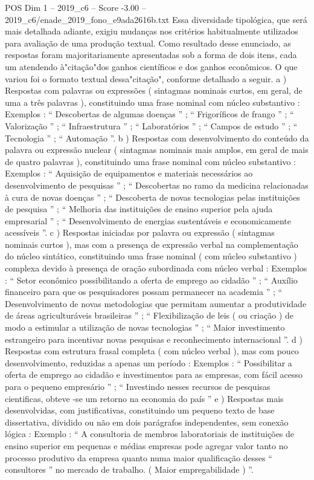 \begin{textsample}{POS Dim 1 – 2019\_c6 – Score -3.00 – 2019\_c6/enade\_2019\_fono\_e9ada2616b.txt}
Essa diversidade tipológica, que será mais detalhada adiante, exigiu mudanças nos critérios habitualmente utilizados para avaliação de uma produção textual.
Como resultado desse enunciado, as respostas foram majoritariamente apresentadas sob a forma de dois itens, cada um atendendo à"citação"dos ganhos científicos e dos ganhos econômicos.
O que variou foi o formato textual dessa"citação", conforme detalhado a seguir. a ) Respostas com palavras ou expressões ( sintagmas nominais curtos, em geral, de uma a três palavras ), constituindo uma frase nominal com núcleo substantivo : Exemplos : “ Descobertas de algumas doenças ” ; “ Frigoríficos de frango ” ; “ Valorização ” ; “ Infraestrutura ” ; “ Laboratórios ” ; “ Campos de estudo ” ; “ Tecnologia ” ; “ Automação ”. b ) Respostas com desenvolvimento do conteúdo da palavra ou expressão nuclear ( sintagmas nominais mais amplos, em geral de mais de quatro palavras ), constituindo uma frase nominal com núcleo substantivo : Exemplos : “ Aquisição de equipamentos e materiais necessários ao desenvolvimento de pesquisas ” ; “ Descobertas no ramo da medicina relacionadas à cura de novas doenças ” ; “ Descoberta de novas tecnologias pelas instituições de pesquisa ” ; “ Melhoria das instituições de ensino superior pela ajuda empresarial ” ; “ Desenvolvimento de energias sustentáveis e economicamente acessíveis ”. c ) Respostas iniciadas por palavra ou expressão ( sintagmas nominais curtos ), mas com a presença de expressão verbal na complementação do núcleo sintático, constituindo uma frase nominal ( com núcleo substantivo ) complexa devido à presença de oração subordinada com núcleo verbal : Exemplos : “ Setor econômico possibilitando a oferta de emprego ao cidadão ” ; “ Auxílio financeiro para que os pesquisadores possam permanecer na academia ” ; “ Desenvolvimento de novas metodologias que permitam aumentar a produtividade de áreas agriculturáveis brasileiras ” ; “ Flexibilização de leis ( ou criação ) de modo a estimular a utilização de novas tecnologias ” ; “ Maior investimento estrangeiro para incentivar novas pesquisas e reconhecimento internacional ”. d ) Respostas com estrutura frasal completa ( com núcleo verbal ), mas com pouco desenvolvimento, reduzidas a apenas um período : Exemplos : “ Possibilitar a oferta de emprego ao cidadão e investimentos para as empresas, com fácil acesso para o pequeno empresário ” ; “ Investindo nesses recursos de pesquisas cientificas, obteve -se um retorno na economia do país ” e ) Respostas mais desenvolvidas, com justificativas, constituindo um pequeno texto de base dissertativa, dividido ou não em dois parágrafos independentes, sem conexão lógica : Exemplo : “ A consultoria de membros laboratoriais de instituições de ensino superior em pequenas e médias empresas pode agregar valor tanto no processo produtivo da empresa quanto numa maior qualificação desses “ consultores ” no mercado de trabalho. ( Maior empregabilidade ) ”.

\end{textsample}
